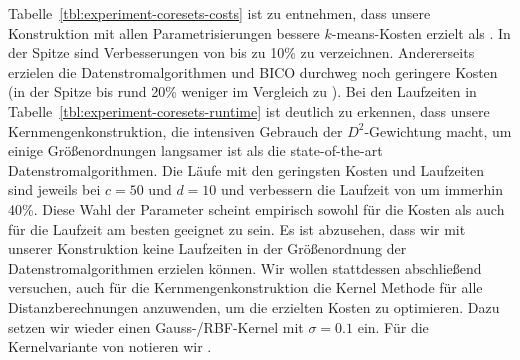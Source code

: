 Tabelle~\ref{tbl:experiment-coresets-costs} ist zu entnehmen, dass unsere Konstruktion mit allen Parametrisierungen bessere
$k$-means-Kosten erzielt als \kmpp. In der Spitze sind Verbesserungen von bis zu 10\% zu verzeichnen. Andererseits erzielen
die Datenstromalgorithmen \Skmpp und BICO durchweg noch geringere Kosten (in der Spitze bis rund 20\% weniger im Vergleich
zu \kmpp). Bei den Laufzeiten in Tabelle~\ref{tbl:experiment-coresets-runtime} ist deutlich zu erkennen, dass unsere
Kernmengenkonstruktion, die intensiven Gebrauch der $D^2$-Gewichtung macht, um einige Größenordnungen langsamer ist als die
state-of-the-art Datenstromalgorithmen. Die Läufe mit den geringsten Kosten und Laufzeiten sind jeweils bei $c = 50$ und
$d = 10$ und verbessern die Laufzeit von \kmpp{} um immerhin 40\%. Diese Wahl der Parameter scheint empirisch sowohl für
die Kosten als auch für die Laufzeit am besten geeignet zu sein.
\absatz
Es ist abzusehen, dass wir mit unserer Konstruktion keine
Laufzeiten in der Größenordnung der Datenstromalgorithmen erzielen können. Wir wollen stattdessen abschließend versuchen,
auch für die Kernmengenkonstruktion die Kernel Methode für alle Distanzberechnungen anzuwenden, um die erzielten Kosten zu
optimieren. Dazu setzen wir wieder einen Gauss-/RBF-Kernel mit $\sigma = 0.1$ ein. Für die Kernelvariante von \CsTwo{} notieren
wir \KCsTwo.

